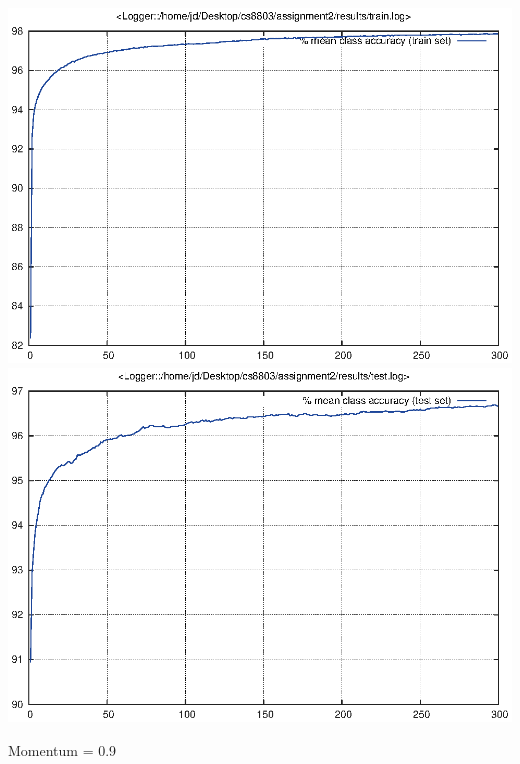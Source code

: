 \documentclass[twoside,12pt]{article}
\newcommand{\imsize}{0.5\linewidth}
\begin{document}
\includegraphics[width=\imsize]{assignment2/results/sgdwm_m5_train}
\includegraphics[width=\imsize]{assignment2/results/sgdwm_m5_test}

Momentum = 0.9
\end{document}
